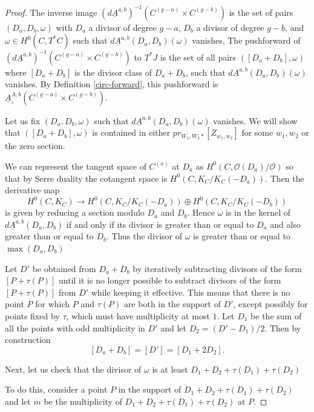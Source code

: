 \begin{proof} The inverse image $\left( d\underline{A}^{a,b}\right)^{-1}  (C^{(g-a)} \times C^{(g-b)} )$ is the set of pairs $(D_a, D_b, \omega)$ with $D_a$ a divisor of degree $g-a$, $D_b$ a divisor of degree $g-b$, and $\omega\in H^0(C, T^*C)$ such that $d\underline{A}^{a,b} (D_a,D_b) (\omega)$ vanishes, The pushforward of $\left( d\underline{A}^{a,b}\right)^{-1}   (C^{(g-a)} \times C^{(g-b)} )$ to $T^* J$ is the set of all pairs $( [D_a + D_b], \omega)$ where $[D_a + D_b]$ is the divisor class of $D_a+D_b$, such that $d\underline{A}^{a,b} (D_a,D_b) (\omega)$ vanishes. By Definition \ref{circ-forward}, this pushforward is $ \underline{A}^{A,b}_{\circ} (C^{(g-a)} \times C^{(g-b)} ) $.

Let us fix $(D_a,D_b,\omega)$ such that $d\underline{A}^{a,b} (D_a,D_b) (\omega)$ vanishes. We will show that $( [D_a + D_b], \omega)$ is contained in either $pr_{W_1,W_2 *} [ Z_{w_1,w_2} ]$ for some $w_1,w_2$ or the zero section.


We can represent the tangent space of  $C^{(a)}$ at $D_a$ as $H^0(C, \mathcal O(D_a) /\mathcal O)$ so that by Serre duality the cotangent space is $H^0(C, K_C / K_C(-D_a) )$. Then the derivative map \[ H^0(C, K_C) \to H^0(C, K_C / K_C (-D_a) ) \oplus H^0(C, K_C / K_C (-D_b) )\] is given by reducing a section modulo $D_a$ and $D_b$. Hence $\omega$ is in the kernel of $d\underline{A}^{a,b} (D_a,D_b) $ if and only if its divisor is greater than or equal to $D_a$ and also greater than or equal to $D_b$. Thus the divisor of $\omega$ is greater than or equal to $\max(D_a,D_b) $

Let $D' $ be obtained from $D_a+D_b$ by iteratively subtracting divisors of the form $[P + \tau (P)]$ until it is no longer possible to subtract divisors of the form $[P + \tau(P)]$ from $D'$ while keeping it effective. This means that there is no point $P$ for which $P$ and $\tau(P)$ are both in the support of $D'$, except possibly for points fixed by $\tau$, which must have multiplicity at most $1$. Let $D_1$ be the sum of all the points with odd multiplicity in $D'$ and let $D_2 = (D' -D_1)/2$.  Then by construction \[  [D_a + D_b] = [D' ] = [D_1 + 2D_2].\]

Next, let us check that the divisor of $\omega$ is at least $D_1+ D_2 + \tau(D_1) + \tau(D_2) $

To do this, consider a point $P$ in the support of $D_1+ D_2 + \tau(D_1) + \tau(D_2) $ and let $m$ be the multiplicity of $D_1+ D_2 + \tau(D_1) + \tau(D_2) $ at $P$.


\end{proof}
